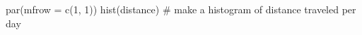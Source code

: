 \begin{Schunk}
\begin{Sinput}
 par(mfrow = c(1, 1))
 hist(distance) # make a histogram of distance traveled per day
\end{Sinput}
\end{Schunk}
